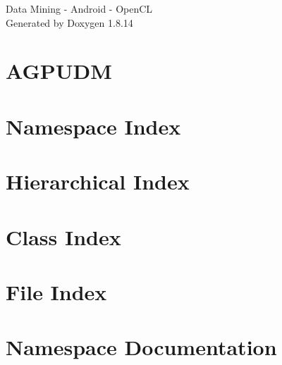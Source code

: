 \documentclass[twoside]{book}
\newcommand{\+}{\discretionary{\mbox{\scriptsize$\hookleftarrow$}}{}{}}
\newcommand{\clearemptydoublepage}{%
  \newpage{\pagestyle{empty}\cleardoublepage}%
}
\begin{document}
\hypersetup{pageanchor=false,
             bookmarksnumbered=true,
             pdfencoding=unicode
            }
\begin{titlepage}
\vspace*{7cm}
\begin{center}%
{\Large Data Mining -\/ Android -\/ Open\+CL }\\
\vspace*{1cm}
{\large Generated by Doxygen 1.8.14}\\
\end{center}
\end{titlepage}
\clearemptydoublepage
{}
\tableofcontents
\clearemptydoublepage
{}
\hypersetup{pageanchor=true}

\chapter{A\+G\+P\+U\+DM}
\label{index}\hypertarget{index}{}
\chapter{Namespace Index}

\chapter{Hierarchical Index}

\chapter{Class Index}

\chapter{File Index}

\chapter{Namespace Documentation}



\end{document}
